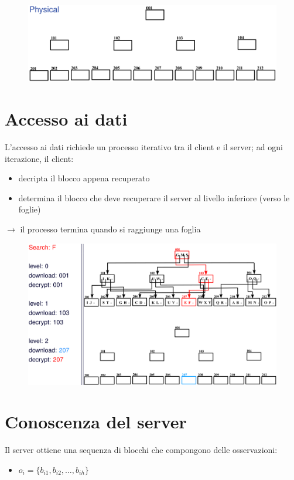 \documentclass{report}
\begin{document}
\begin{figure}[ht]
    \centering
    \includegraphics[width=1\linewidth]{images/b+-tree-physical.png}
\end{figure}

\section{Accesso ai dati}
L'accesso ai dati richiede un processo iterativo tra il client e il server;
ad ogni iterazione, il client:
\begin{itemize}
    \item decripta il blocco appena recuperato 
    \item determina il blocco che deve recuperare il server al livello inferiore (verso le foglie)
\end{itemize}

$\rightarrow$ il processo termina quando si raggiunge una foglia

\begin{figure}[ht]
    \centering
    \includegraphics[width=1\linewidth]{images/data-access.png}
\end{figure}

\section{Conoscenza del server}
Il server ottiene una sequenza di blocchi che compongono delle osservazioni:
\begin{itemize}
    \item $o_i = \{ b_{i1}, b_{i2}, \dots, b_{ih} \}$
\end{itemize}
\end{document}
